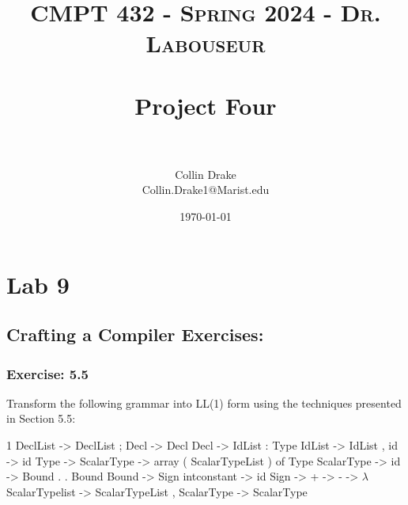 \documentclass[letterpaper, 10pt,DIV=13]{scrartcl}
\title{	
   \normalfont \normalsize 
   \textsc{CMPT 432 - Spring 2024 - Dr. Labouseur} \\[10pt] %
   \horrule{0.5pt} \\[0.25cm] 	%
   \huge Project Four  \\     	    %
   \horrule{0.5pt} \\[0.25cm] 	%
}
\author{Collin Drake \\ \normalsize Collin.Drake1@Marist.edu}
\date{\normalsize\today} 	%
\numberwithin{equation}{section} %
\numberwithin{figure}{section} %
\numberwithin{table}{section} %
\begin{document}
\maketitle %

\section*{Lab 9}

\subsection*{Crafting a Compiler Exercises:}

\subsubsection*{Exercise: 5.5}
Transform the following grammar into LL(1) form using the techniques presented in Section 5.5:  \newline

1   DeclList        ->  DeclList ; Decl                   ->  Decl   Decl            ->  IdList : Type   IdList          ->  IdList , id                   ->  id   Type            ->  ScalarType                   ->  array ( ScalarTypeList ) of Type   ScalarType      ->  id                   ->  Bound . . Bound  Bound           ->  Sign intconstant                  ->  id  Sign            ->  +                  ->  -                  ->  $\lambda$  ScalarTypelist  ->  ScalarTypeList , ScalarType                  ->  ScalarType\newline
\end{document}
